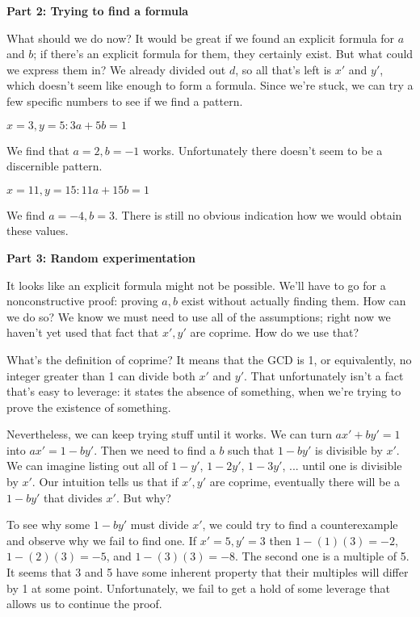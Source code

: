 \documentclass[11pt]{article}
\begin{document}
    \textbf{Part 2: Trying to find a formula}
    
    What should we do now? It would be great if we found an explicit formula for $a$ and
    $b$; if there's an explicit formula for them, they certainly exist. But what could we
    express them in? We already divided out $d$, so all that's left is $x'$ and $y'$,
    which doesn't seem like enough to form a formula. Since we're stuck, we can try a few
    specific numbers to see if we find a pattern.
    
    $x=3,y=5: 3a+5b=1$
    
    We find that $a=2,b=-1$ works. Unfortunately there doesn't seem to be a discernible
    pattern.
    
    $x=11,y=15: 11a+15b=1$
    
    We find $a=-4,b=3$. There is still no obvious indication how we would obtain these 
    values.
    
    \textbf{Part 3: Random experimentation}
    
    It looks like an explicit formula might not be possible. We'll have to go for a
    nonconstructive proof: proving $a,b$ exist without actually finding them. How can
    we do so? We know we must need to use all of the assumptions; right now we haven't
    yet used that fact that $x',y'$ are coprime. How do we use that?
    
    What's the definition of coprime? It means that the GCD is 1, or equivalently,
    no integer greater than 1 can divide both $x'$ and $y'$. That unfortunately isn't
    a fact that's easy to leverage: it states the absence of something, when we're trying
    to prove the existence of something.
    
    Nevertheless, we can keep trying stuff until it works. We can turn $ax'+by'=1$
    into $ax'=1-by'$. Then we need to find a $b$ such that $1-by'$ is divisible by $x'$.
    We can imagine listing out all of $1-y'$, $1-2y'$, $1-3y'$, ... until one is divisible
    by $x'$. Our intuition tells us that if $x',y'$ are coprime, eventually there will be
    a $1-by'$ that divides $x'$. But why?
    
    To see why some $1-by'$ must divide $x'$, we could try to find a counterexample and
    observe why we fail to find one. If $x'=5,y'=3$ then $1-(1)(3)=-2$, $1-(2)(3)=-5$,
    and $1-(3)(3)=-8$. The second one is a multiple of 5. It seems that 3 and 5 have
    some inherent property that their multiples will differ by 1 at some point.
    Unfortunately, we fail to get a hold of some leverage that allows us to continue
    the proof.
    
\end{document}
